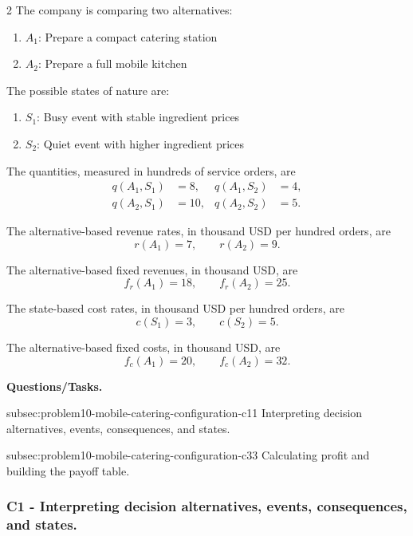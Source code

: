 \begin{multicols}{2}
	The company is comparing two alternatives:
	\begin{enumerate}[label=\arabic*.]
		\item \(A_1\): Prepare a compact catering station
		\item \(A_2\): Prepare a full mobile kitchen
	\end{enumerate}
	
	The possible states of nature are:
	\begin{enumerate}[label=\arabic*.]
		\item \(S_1\): Busy event with stable ingredient prices
		\item \(S_2\): Quiet event with higher ingredient prices
	\end{enumerate}
	
	\columnbreak
	
	The quantities, measured in hundreds of service orders, are
	\[
	\begin{aligned}
		q(A_1,S_1)&=8,
		&
		q(A_1,S_2)&=4,
		\\
		q(A_2,S_1)&=10,
		&
		q(A_2,S_2)&=5.
	\end{aligned}
	\]
	
	The alternative-based revenue rates, in thousand USD per hundred
	orders, are
	\[
	r(A_1)=7,
	\qquad
	r(A_2)=9.
	\]
	
	The alternative-based fixed revenues, in thousand USD, are
	\[
	f_r(A_1)=18,
	\qquad
	f_r(A_2)=25.
	\]
	
	The state-based cost rates, in thousand USD per hundred orders, are
	\[
	c(S_1)=3,
	\qquad
	c(S_2)=5.
	\]
	
	The alternative-based fixed costs, in thousand USD, are
	\[
	f_c(A_1)=20,
	\qquad
	f_c(A_2)=32.
	\]
\end{multicols}

\textbf{Questions/Tasks.}
\begin{enumerate}
	\CriterionTask
	{subsec:problem10-mobile-catering-configuration-c1}{1}
	{Interpreting decision alternatives, events, consequences, and states.}

	\CriterionTask
	{subsec:problem10-mobile-catering-configuration-c3}{3}
	{Calculating profit and building the payoff table.}
\end{enumerate}

\subsubsection*{C1 - Interpreting decision alternatives, events, consequences, and states.}
\label{subsec:problem10-mobile-catering-configuration-c1}

